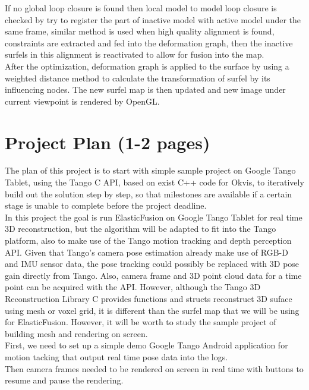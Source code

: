 \documentclass[12pt,twoside]{article}
\begin{document}
If no global loop closure is found then local model to model loop closure is checked by try to register the part of inactive model with active model under the same frame, similar method is used when high quality alignment is found, constraints are extracted and fed into  the deformation graph, then the inactive surfels in this alignment is reactivated to allow for fusion into the map.\\
After the optimization, deformation graph is applied to the surface by using a weighted distance method to calculate the transformation of surfel by its influencing nodes. The new surfel map is then updated and new image under current viewpoint is rendered by OpenGL.\\ 


\section{Project Plan (1-2 pages)}
The plan of this project is to start with simple sample project on Google Tango Tablet, using the Tango C API, based on exist C++ code for Okvis\cite{leutenegger2015keyframe}, to iteratively build out the solution step by step, so that milestones are available if a certain stage is unable to complete before the project deadline.\\
In this project the goal is run ElasticFusion\citep{whelan2015elasticfusion} on Google Tango Tablet for real time 3D reconstruction, but the algorithm will be adapted to fit into the Tango platform, also to make use of the Tango motion tracking and depth perception API. Given that Tango's camera pose estimation already make use of RGB-D and IMU sensor data, the pose tracking could possibly be replaced with 3D pose gain directly from Tango. Also, camera frame and 3D point cloud data for a time point can be acquired with the API. However, although the Tango 3D Reconstruction Library C provides functions and structs reconstruct 3D suface using mesh or voxel grid, it is different than the surfel map that we will be using for ElasticFusion\citep{whelan2015elasticfusion}. However, it will be worth to study the sample project of building mesh and rendering on screen.\\
First, we need to set up a simple demo Google Tango Android application for motion tacking that output real time pose data into the logs.\\
Then camera frames needed to be rendered on screen in real time with buttons to resume and pause the rendering.\\
\end{document}
